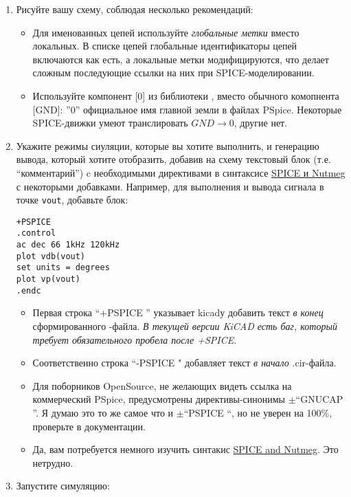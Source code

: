
\begin{enumerate}
  \item
Рисуйте вашу схему, соблюдая несколько рекомендаций:  
\begin{itemize}
  \item
Для именованных цепей используйте \emph{глобальные метки} вместо локальных. 
В списке цепей глобальные идентификаторы цепей включаются как есть, а
локальные метки модифицируются, что делает сложным последующие ссылки на них при
SPICE-моделировании.
  \item
Используйте компонент [0] из библиотеки , вместо обычного комопнента
[GND]: ”0” официальное имя главной земли в файлах PSpice. Некоторые SPICE-движки
умеют транслировать $GND \rightarrow 0$, другие нет.
\end{itemize}
  \item
Укажите режимы сиуляции, которые вы хотите выполнить, и генерацию вывода,
который хотите отобразить, добавив на схему текстовый блок (т.е.
``комментарий'') c необходимыми директивами в синтаксисе
\href{http://newton.ex.ac.uk/teaching/cdhw/Electronics2/userguide/sec5.html}{SPICE и Nutmeg}
с некоторыми добавками. Например, для выполнения  и вывода сигнала в точке \verb|vout|, добавьте блок:
\begin{lstlisting}
+PSPICE
.control
ac dec 66 1kHz 120kHz
plot vdb(vout)
set units = degrees
plot vp(vout)
.endc
\end{lstlisting}
\begin{itemize}
  \item
Первая строка ``+PSPICE '' указывает kicadу добавить текст \emph{в конец}
сформированного -файла. \emph{В текущей версии KiCAD есть баг,
который требует обязательного пробела после +SPICE}.
  \item
Соответственно строка ``-PSPICE " добавляет текст \emph{в начало} .cir-файла.
  \item
Для поборников OpenSource, не желающих видеть ссылка на коммерческий PSpice,
предусмотрены директивы-синонимы $\pm$``GNUCAP ''. Я думаю это то же самое что и
$\pm$``PSPICE ``, но не уверен на 100\%, проверьте в документации.
  \item
Да, вам потребуется немного изучить синтакис 
\href{http://newton.ex.ac.uk/teaching/cdhw/Electronics2/userguide/sec5.html}{SPICE
and Nutmeg}. Это нетрудно.
\end{itemize}
  \item
Запустите симуляцию:

\end{enumerate}
